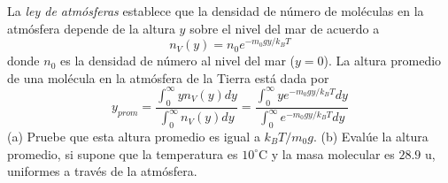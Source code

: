 \item La \textit{ley de atmósferas} establece que la densidad de número de moléculas en la atmósfera depende de la altura $y$ sobre el nivel del mar de acuerdo a
$$ n_V(y) = n_0 e^{-m_0gy/k_BT} $$
donde $n_0$ es la densidad de número al nivel del mar ($y = 0$). La altura promedio de una molécula en la atmósfera de la Tierra está dada por
$$ y_{prom} = \frac{\int_0^\infty y n_V(y) dy}{\int_0^\infty n_V(y) dy} = \frac{\int_0^\infty y e^{-m_0gy/k_BT} dy}{\int_0^\infty e^{-m_0gy/k_BT} dy} $$
(a) Pruebe que esta altura promedio es igual a $k_BT/m_0g$. (b) Evalúe la altura promedio, si supone que la temperatura es $10^\circ\text{C}$ y la masa molecular es $28.9\text{ u}$, uniformes a través de la atmósfera.
